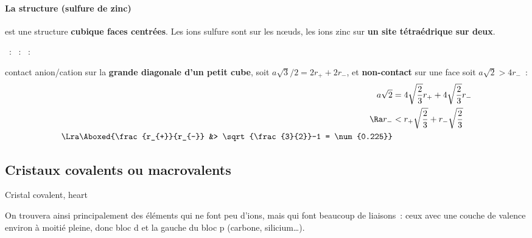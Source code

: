 \documentclass[../main/main.tex]{subfiles}
\begin{document}
\paragraph*{La structure  (sulfure de zinc)} est une structure
\textbf{cubique faces centrées}. Les ions sulfure sont sur les nœuds, les ions
zinc sur \textbf{un site tétraédrique sur deux}.
\vspace{20pt}
\begin{itemize}[label=$\diamond$]
  ~:
    \vspace{20pt}
  ~:
    \vspace{20pt}
  ~:
  \begin{hide}
    contact anion/cation sur la \textbf{grande
    diagonale d'un petit cube}, soit $a \sqrt{3}/2 = 2r_{+} + 2r_{-}$, et
    \textbf{non-contact} sur une face soit $a \sqrt{2} > 4r_{-}$~:
    \begin{align*}
      a \sqrt{2} &= 4 \sqrt{\frac{2}{3}}r_{+} + 4 \sqrt{\frac{2}{3}}r_{-}
      \\\Ra
      r_{-} &< r_{+}\sqrt{\frac{2}{3}} + r_{-}\sqrt{\frac{2}{3}}
      \\\Lra
      \Aboxed{\frac{r_{+}}{r_{-}} &> \sqrt{\frac{3}{2}}-1 = \num{0.225}}
    \end{align*}
\end{hide}
    \vspace{20pt}
\end{itemize}

\subsection{Cristaux covalents ou macrovalents}
\begin{tdefi}{Cristal covalent, heart}
\end{tdefi}
On trouvera ainsi principalement des éléments qui ne font peu d'ions, mais qui
font beaucoup de liaisons~: ceux avec une couche de valence environ à moitié
pleine, donc bloc d et la gauche du bloc p (carbone, silicium…).
\end{document}
